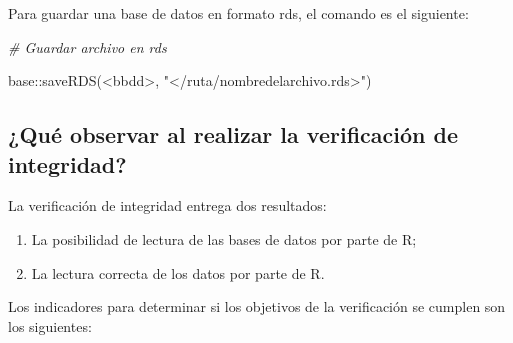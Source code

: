 \documentclass[
  spanish,
]{book}
\newenvironment{Shaded}{\begin{snugshade}}{\end{snugshade}}
\newcommand{\CommentTok}[1]{\textcolor[rgb]{0.56,0.35,0.01}{\textit{#1}}}
\newcommand{\FunctionTok}[1]{\textcolor[rgb]{0.00,0.00,0.00}{#1}}
\newcommand{\NormalTok}[1]{#1}
\newcommand{\SpecialCharTok}[1]{\textcolor[rgb]{0.00,0.00,0.00}{#1}}
\newcommand{\StringTok}[1]{\textcolor[rgb]{0.31,0.60,0.02}{#1}}
\begin{document}
Para guardar una base de datos en formato rds, el comando es el siguiente:

\begin{Shaded}
\begin{Highlighting}[]
\CommentTok{\# Guardar archivo en rds}

\NormalTok{base}\SpecialCharTok{::}\FunctionTok{saveRDS}\NormalTok{(}\SpecialCharTok{\textless{}}\NormalTok{bbdd}\SpecialCharTok{\textgreater{}}\NormalTok{, }\StringTok{"\textless{}/ruta/nombredelarchivo.rds\textgreater{}"}\NormalTok{)}
\end{Highlighting}
\end{Shaded}

\hypertarget{quuxe9-observar-al-realizar-la-verificaciuxf3n-de-integridad}{%
\subsection{¿Qué observar al realizar la verificación de integridad?}\label{quuxe9-observar-al-realizar-la-verificaciuxf3n-de-integridad}}

La verificación de integridad entrega dos resultados:

\begin{enumerate}
\def\labelenumi{\arabic{enumi}.}
\item
  La posibilidad de lectura de las bases de datos por parte de R;
\item
  La lectura correcta de los datos por parte de R.
\end{enumerate}

Los indicadores para determinar si los objetivos de la verificación se cumplen son los siguientes:
\end{document}
